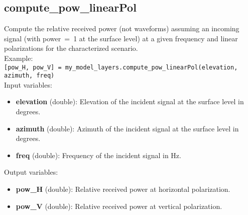 \subsection{compute\_pow\_linearPol}

Compute the relative received power (not waveforms) assuming an incoming signal (with power~=~1 at the surface level) at a given frequency and linear polarizations for the characterized scenario.\\

Example:\\

\texttt{[pow\_H, pow\_V] = my\_model\_layers.compute\_pow\_linearPol(elevation, azimuth, freq)}\\

Input variables:
\begin{itemize}
\item {\bf elevation} (double): Elevation of the incident signal at the surface level in degrees.
\item {\bf azimuth} (double): Azimuth of the incident signal at the surface level in degrees.
\item {\bf freq} (double): Frequency of the incident signal in Hz.
\end{itemize}

Output variables:
\begin{itemize}
\item {\bf pow\_H} (double): Relative received power at horizontal polarization.
\item {\bf pow\_V} (double): Relative received power at vertical polarization.
\end{itemize}
